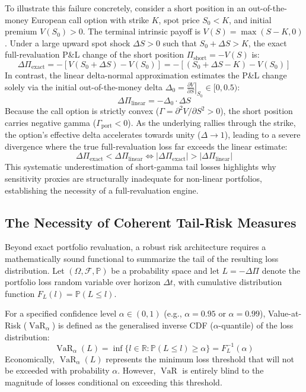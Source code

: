 \documentclass{article}
\theoremstyle{plain}
\theoremstyle{definition}
\theoremstyle{remark}
\DeclareMathOperator{\VaR}{VaR}
\begin{document}
To illustrate this failure concretely, consider a short position in an out-of-the-money European call option with strike $K$, spot price $S_0 < K$, and initial premium $V(S_0) > 0$. The terminal intrinsic payoff is $V(S) = \max(S - K, 0)$. Under a large upward spot shock $\Delta S > 0$ such that $S_0 + \Delta S > K$, the exact full-revaluation P\&L change of the short position $\Pi_{\text{short}} = -V(S)$ is:
\begin{equation}
    \Delta \Pi_{\text{exact}} = -\left[ V(S_0 + \Delta S) - V(S_0) \right] = -\left[ (S_0 + \Delta S - K) - V(S_0) \right]
\end{equation}
In contrast, the linear delta-normal approximation estimates the P\&L change solely via the initial out-of-the-money delta $\Delta_0 = \left.\frac{\partial V}{\partial S}\right|_{S_0} \in [0, 0.5)$:
\begin{equation}
    \Delta \Pi_{\text{linear}} = -\Delta_0 \cdot \Delta S
\end{equation}
Because the call option is strictly convex ($\Gamma = \partial^2 V / \partial S^2 > 0$), the short position carries negative gamma ($\Gamma_{\text{port}} < 0$). As the underlying rallies through the strike, the option's effective delta accelerates towards unity ($\Delta \to 1$), leading to a severe divergence where the true full-revaluation loss far exceeds the linear estimate:
\begin{equation}
    \Delta \Pi_{\text{exact}} < \Delta \Pi_{\text{linear}} \iff |\Delta \Pi_{\text{exact}}| > |\Delta \Pi_{\text{linear}}|
\end{equation}
This systematic underestimation of short-gamma tail losses highlights why sensitivity proxies are structurally inadequate for non-linear portfolios, establishing the necessity of a full-revaluation engine.

\subsection{The Necessity of Coherent Tail-Risk Measures}
Beyond exact portfolio revaluation, a robust risk architecture requires a mathematically sound functional to summarize the tail of the resulting loss distribution. Let $(\Omega, \mathcal{F}, \mathbb{P})$ be a probability space and let $L = -\Delta \Pi$ denote the portfolio loss random variable over horizon $\Delta t$, with cumulative distribution function $F_L(l) = \mathbb{P}(L \le l)$.

For a specified confidence level $\alpha \in (0, 1)$ (e.g., $\alpha = 0.95$ or $\alpha = 0.99$), Value-at-Risk ($\VaR_\alpha$) is defined as the generalised inverse CDF ($\alpha$-quantile) of the loss distribution:
\begin{equation}
    \VaR_\alpha(L) = \inf \{ l \in \mathbb{R} : \mathbb{P}(L \le l) \ge \alpha \} = F_L^{-1}(\alpha)
\end{equation}
Economically, $\VaR_\alpha(L)$ represents the minimum loss threshold that will not be exceeded with probability $\alpha$. However, $\VaR$ is entirely blind to the magnitude of losses conditional on exceeding this threshold.
\end{document}
